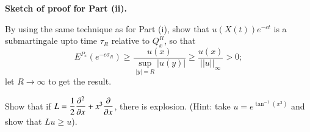 \noindent
{\bf Sketch of proof for Part (ii).}~
\smallskip

By using the same technique as for Part (i), show that
$u(X(t))e^{-ct}$ is a submartingale upto time $\tau_{R}$ relative to
$Q^{R}_{x}$, so that
$$
E^{P_{x}}(e^{-c\sigma_{R}})\geq
\frac{u(x)}{\sup\limits_{|y|=R}|u(y)|}\geq
\frac{u(x)}{||u||_{\infty}}>0; 
$$\pageoriginale
let $R\to \infty$ to get the result.

\begin{exer*}
Show that if $L=\dfrac{1}{2}\dfrac{\partial^{2}}{\partial x}+x^{3}\dfrac{\partial}{\partial
  x}$, there is explosion. (Hint: take $u=e^{\tan^{-1}(x^{2})}$ and
show that $Lu\geq u$).
\end{exer*}








